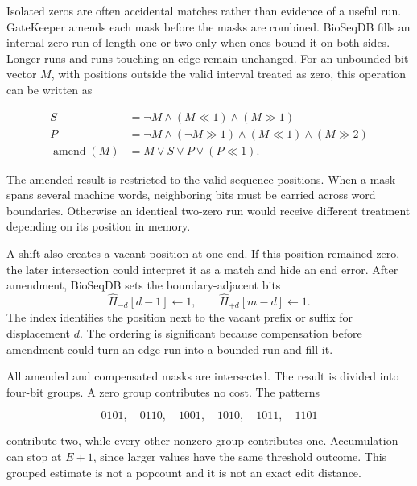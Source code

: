 Isolated zeros are often accidental matches rather than evidence of a useful
run. GateKeeper amends each mask before the masks are combined. BioSeqDB fills
an internal zero run of length one or two only when ones bound it on both
sides. Longer runs and runs touching an edge remain unchanged. For an
unbounded bit vector \(M\), with positions outside the valid interval treated
as zero, this operation can be written as

\[
\begin{aligned}
S &= \neg M \land (M\ll1) \land (M\gg1)\\
P &= \neg M \land (\neg M\gg1) \land (M\ll1) \land (M\gg2)\\
\operatorname{amend}(M) &= M\lor S\lor P\lor(P\ll1).
\end{aligned}
\]

The amended result is restricted to the valid sequence positions. When a mask
spans several machine words, neighboring bits must be carried across word
boundaries. Otherwise an identical two-zero run would receive different
treatment depending on its position in memory.

A shift also creates a vacant position at one end. If this position remained
zero, the later intersection could interpret it as a match and hide an end
error. After amendment, BioSeqDB sets the boundary-adjacent bits
\[
    \widehat H_{-d}[d-1]\gets1,
    \qquad
    \widehat H_{+d}[m-d]\gets1.
\]
The index identifies the position next to the vacant prefix or suffix for
displacement \(d\). The ordering is significant because compensation before
amendment could turn an edge run into a bounded run and fill it.

All amended and compensated masks are intersected. The result is divided into
four-bit groups. A zero group contributes no cost. The patterns

\[
0101,\quad 0110,\quad 1001,\quad 1010,\quad 1011,\quad 1101
\]

contribute two, while every other nonzero group contributes one. Accumulation
can stop at \(E+1\), since larger values have the same threshold outcome. This
grouped estimate is not a popcount and it is not an exact edit distance.

